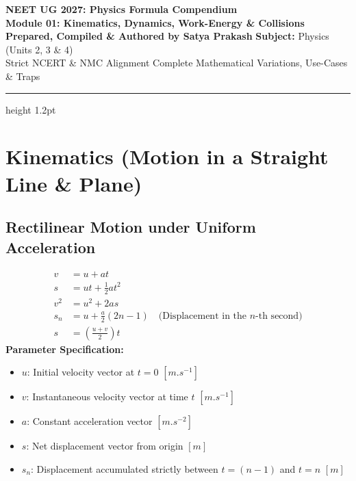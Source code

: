 \documentclass[11pt,a4paper]{article}
\begin{document}
\begin{center}
  {\huge\bfseries\color{primarydark} NEET UG 2027: Physics Formula Compendium}\\[6pt]
  {\Large\bfseries\color{accentblue} Module 01: Kinematics, Dynamics, Work-Energy \& Collisions}\\[8pt]
  {\normalsize\textbf{Prepared, Compiled \& Authored by Satya Prakash} \quad\textbar\quad \textbf{Subject:} Physics (Units 2, 3 \& 4)}\\[4pt]
  {\footnotesize\color{gray} Strict NCERT \& NMC Alignment \quad\textbar\quad Complete Mathematical Variations, Use-Cases \& Traps}
\end{center}
\vspace{-2pt}
\hrule height 1.2pt
\vspace{8pt}

\section{Kinematics (Motion in a Straight Line \& Plane)}

\subsection{Rectilinear Motion under Uniform Acceleration}

\begin{formulabox}[Master Kinematic Equations (Constant Acceleration $a = \text{const}$)]
\begin{align}
  v &= u + at \\
  s &= ut + \frac{1}{2}at^2 \\
  v^2 &= u^2 + 2as \\
  s_n &= u + \frac{a}{2}(2n - 1) \quad \text{(Displacement in the $n$-th second)} \\
  s &= \left(\frac{u + v}{2}\right)t
\end{align}
\textbf{Parameter Specification:}
\begin{itemize}
  \item $u$: Initial velocity vector at $t=0$ $[\si{m.s^{-1}}]$
  \item $v$: Instantaneous velocity vector at time $t$ $[\si{m.s^{-1}}]$
  \item $a$: Constant acceleration vector $[\si{m.s^{-2}}]$
  \item $s$: Net displacement vector from origin $[\si{m}]$
  \item $s_n$: Displacement accumulated strictly between $t = (n-1)$ and $t = n$ $[\si{m}]$
\end{itemize}
\end{formulabox}
\end{document}

